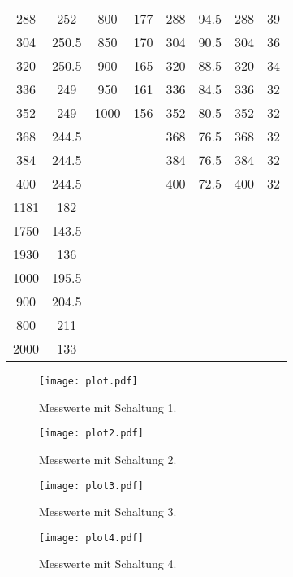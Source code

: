 \documentclass[
  bibliography=totoc,     %
  captions=tableheading,  %
  titlepage=firstiscover, %
]{scrartcl}
\begin{document}
\begin{table}
\begin{tabular}{c c c c c c c c}
    288   & 252   & 800  & 177   & 288  & 94.5  & 288  & 39    \\
    304   & 250.5 & 850  & 170   & 304  & 90.5  & 304  & 36    \\
    320   & 250.5 & 900  & 165   & 320  & 88.5  & 320  & 34    \\
    336   & 249   & 950  & 161   & 336  & 84.5  & 336  & 32    \\
    352   & 249   & 1000 & 156   & 352  & 80.5  & 352  & 32    \\
    368   & 244.5 &      &       & 368  & 76.5  & 368  & 32    \\
    384   & 244.5 &      &       & 384  & 76.5  & 384  & 32    \\
    400   & 244.5 &      &       & 400  & 72.5  & 400  & 32    \\
    1181  & 182   &      &       &      &       &      &       \\
    1750  & 143.5 &      &       &      &       &      &       \\
    1930  & 136   &      &       &      &       &      &       \\
    1000  & 195.5 &      &       &      &       &      &       \\
    900   & 204.5 &      &       &      &       &      &       \\
    800   & 211   &      &       &      &       &      &       \\
    2000  & 133   &      &       &      &       &      &       \\
    \bottomrule
  \end{tabular}
\end{table}
\begin{figure}
  \centering
  \texttt{[image: plot.pdf]}
  \caption{Messwerte mit Schaltung 1.}
  \label{fig:plot}
\end{figure}
\begin{figure}
  \centering
  \texttt{[image: plot2.pdf]}
  \caption{Messwerte mit Schaltung 2.}
  \label{fig:plot2}
\end{figure}
\begin{figure}
  \centering
  \texttt{[image: plot3.pdf]}
  \caption{Messwerte mit Schaltung 3.}
  \label{fig:plot3}
\end{figure}
\begin{figure}
  \centering
  \texttt{[image: plot4.pdf]}
  \caption{Messwerte mit Schaltung 4.}
  \label{fig:plot4}
\end{figure}
\clearpage
\end{document}
